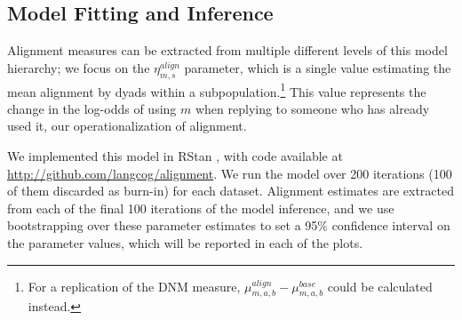\documentclass{acm_proc_article-sp}
\begin{document}
\subsection{Model Fitting and Inference}
Alignment measures can be extracted from multiple different levels of this model hierarchy; we focus on the $\eta^{align}_{m,s}$ parameter, which is a single value estimating the mean alignment by dyads within a subpopulation.\footnote{For a replication of the DNM measure, $\mu^{align}_{m,a,b}-\mu^{base}_{m,a,b}$ could be calculated instead.}  This value represents the change in the log-odds of using $m$ when replying to someone who has already used it, our operationalization of alignment.

We implemented this model in RStan \cite{?}, with code available at \url{http://github.com/langcog/alignment}. We run the model over 200 iterations (100 of them discarded as burn-in) for each dataset.  Alignment estimates are extracted from each of the final 100 iterations of the model inference, and we use bootstrapping over these parameter estimates to set a 95\% confidence interval on the parameter values, which will be reported in each of the plots.


\end{document}

